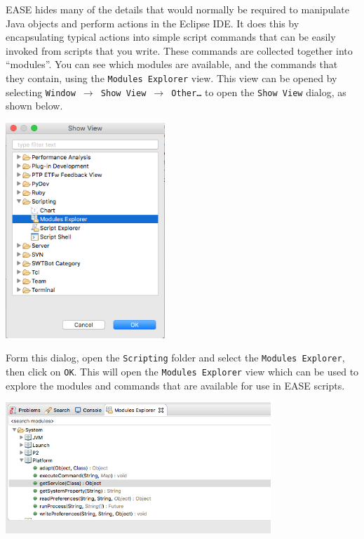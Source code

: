 \documentclass{article}
\begin{document}
EASE hides many of the details that would normally be required to manipulate
Java objects and perform actions in the Eclipse IDE. It does this by
encapsulating typical actions into simple script commands that can be easily
invoked from scripts that you write. These commands are collected together into
``modules''. You can see which modules are available, and the commands that they
contain, using the \texttt{Modules Explorer} view. This view can be opened by
selecting \texttt{Window $\rightarrow$ Show View $\rightarrow$ Other\ldots} to
open the \texttt{Show View} dialog, as shown below.

\begin{center}
\includegraphics[width=6cm]{images/showview}
\end{center}

Form this dialog, open the \texttt{Scripting} folder and select the
\texttt{Modules Explorer}, then click on \texttt{OK}. This will open the
\texttt{Modules Explorer} view which can be used to explore the modules and commands
that are available for use in EASE scripts.

\begin{center}
\includegraphics[width=10cm]{images/modulesexplorer}
\end{center}
\end{document}
